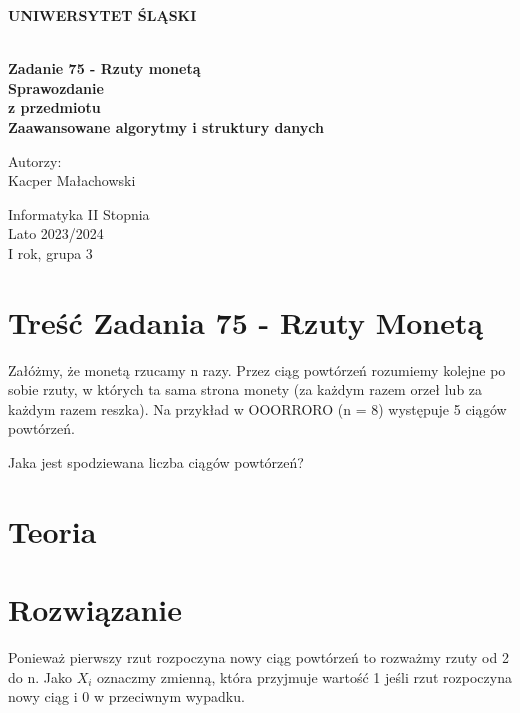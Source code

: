 \documentclass[12pt,oneside,a4paper]{book} %
\theoremstyle{break}
\begin{document}
\thispagestyle{empty}
\begin{center}
  \Large
  \bf{UNIWERSYTET ŚLĄSKI}\\
  \bf{}\\[25mm]
  \large

  \bf{Zadanie 75 - Rzuty monetą}\\[35mm]

  Sprawozdanie\\
  z przedmiotu\\
  Zaawansowane algorytmy i struktury danych\\[25mm]
\end{center}
\begin{flushright}
  \large
  Autorzy:\\
  Kacper Małachowski\\
\end{flushright}
\vspace*{\fill}
\begin{center}
  Informatyka II Stopnia\\
  Lato 2023/2024\\
  I rok, grupa 3\\[25mm]
\end{center}

\chapter*{Treść Zadania 75 - Rzuty Monetą}

Załóżmy, że monetą rzucamy n razy. Przez ciąg powtórzeń rozumiemy kolejne po sobie rzuty, w których ta sama strona monety (za każdym razem orzeł lub za każdym razem reszka). Na przykład w OOORRORO (n = 8) występuje 5 ciągów powtórzeń.

Jaka jest spodziewana liczba ciągów powtórzeń?

\chapter*{Teoria}


\chapter*{Rozwiązanie}

Ponieważ pierwszy rzut rozpoczyna nowy ciąg powtórzeń to rozważmy rzuty od 2 do n. Jako $X_i$ oznaczmy zmienną, która przyjmuje wartość 1 jeśli rzut rozpoczyna nowy ciąg i 0 w przeciwnym wypadku.
\end{document}
